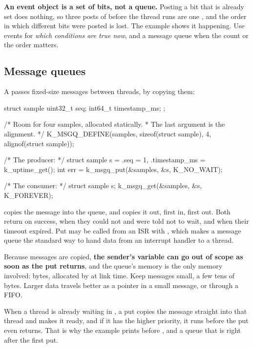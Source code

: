 \textbf{An event object is a set of bits, not a queue.} Posting a bit that is already set does
nothing, so three posts of  before the thread runs are one , and
the order in which different bits were posted is lost. The  example
shows it happening. Use events for \emph{which conditions are true now}, and a message queue when
the count or the order matters.

\subsection{Message queues}
A  passes fixed-size messages between threads, by copying them:

\begin{ccode}
struct sample {
	uint32_t seq;
	int64_t timestamp_ms;
};

/* Room for four samples, allocated statically.
 * The last argument is the alignment. */
K_MSGQ_DEFINE(samples, sizeof(struct sample), 4, alignof(struct sample));

/* The producer: */
struct sample s = {.seq = 1, .timestamp_ms = k_uptime_get()};
int err = k_msgq_put(&samples, &s, K_NO_WAIT);

/* The consumer: */
struct sample s;
k_msgq_get(&samples, &s, K_FOREVER);
\end{ccode}

\noindent {} copies the message into the queue, and  copies it
out, first in, first out. Both return  on success,  when they could not and
were told not to wait, and  when their timeout expired. Put may be called from an ISR
with , which makes a message queue the standard way to hand data from an interrupt
handler to a thread.

Because messages are copied, \textbf{the sender’s variable can go out of scope as soon as the put
returns}, and the queue’s memory is the only memory involved:  bytes,
allocated by  at link time. Keep messages small, a few tens of bytes. Larger
data travels better as a pointer in a small message, or through a FIFO.

When a thread is already waiting in , a put copies the message straight into that
thread and makes it ready, and if it has the higher priority, it runs before the put even returns.
That is why the  example prints  before
, and a queue that is  right after the first put.

